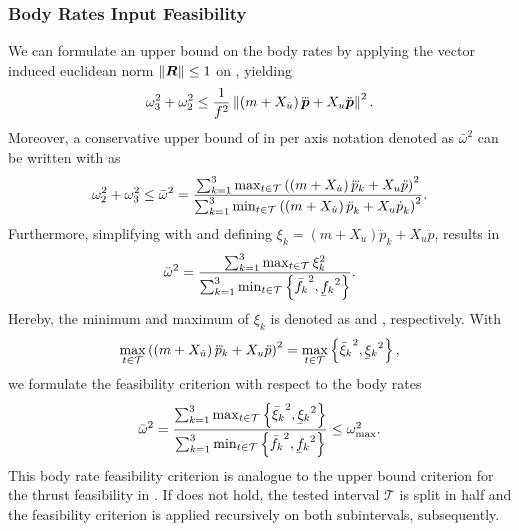 \subsubsection{Body Rates Input Feasibility}
We can formulate an upper bound on the body rates by applying the vector induced euclidean norm $\left\lVert\mbox{$\bm{R}$}\right\rVert \leq 1$ on , yielding
\begin{equation}
	\label{eq:body-rates-bound}
	\omega_3^2 + \omega_2^2 \leq
	\frac{1}{f^2}
	\left\lVert
		\left(
			m + X_{\dot{u}}
		\right) \mbox{$\dddot{\bm{p}}$} + X_u \mbox{$\ddot{\bm{p}}$}
	\right\rVert^2
	.
\end{equation}
Moreover, a conservative upper bound of  in per axis notation denoted as $\bar{\omega}^2$ can be written with  as
\begin{equation}
	\omega_2^2 + \omega_3^2
	\leq
	\bar{\omega}^2
	=
	\frac{
		\sum_{k=1}^{3}
		\max_{t \in \mathcal{T}}
		\left(
			\left(
				m + X_{\dot{u}}
			\right)\dddot{p}_k + X_u \ddot{p}
		\right)^2
	}{
		\sum_{k=1}^{3}
		\min_{t \in \mathcal{T}}
		\left(
			\left(m + X_{\dot{u}}\right)\mbox{$\ddot{p}$}_k
			+ X_u \mbox{$\dot{p}$}_k
		\right)^2
	}
	.
\end{equation}
Furthermore, simplifying with  and defining $\xi_k = \left(m + X_{\dot{u}}\right)\dddot{p}_k + X_u \ddot{p}$, results in
\begin{equation}
	\bar{\omega}^2 =
	\frac{
		\sum_{k=1}^{3}
		\max_{t \in \mathcal{T}}
		\xi_k^2
	}{
		\sum_{k=1}^{3}
		\min_{t \in \mathcal{T}}
		\left\{\fmaxaxis^2, \fminaxis^2\right\}
	}
	.
\end{equation}
Hereby, the minimum and maximum of $\xi_k$ is denoted as \ximaxaxis and \ximinaxis, respectively. With
\begin{equation}
	\max_{t \in \mathcal{T}}
	\left(
		\left(
			m + X_{\dot{u}}
		\right)
		\dddot{p}_k + X_u \ddot{p}
	\right)^2 =
	\max_{t \in \mathcal{T}}
	\left\{
		\ximaxaxis^2, \ximinaxis^2
	\right\}
	,
\end{equation}
we formulate the feasibility criterion with respect to the body rates
\begin{equation}
	\label{eq:body-rates-criterion-per-axis}
	\bar{\omega}^2
	=
	\frac{
		\sum_{k=1}^{3}
		\max_{t \in \mathcal{T}}
		\left\{
			\ximaxaxis^2, \ximinaxis^2
		\right\}
	}{
		\sum_{k=1}^{3}
		\min_{t \in \mathcal{T}}
		\left\{\fmaxaxis^2, \fminaxis^2\right\}
	}
	\leq
	\omegamaxsquare
	.
\end{equation}
This body rate feasibility criterion is analogue to the upper bound criterion for the thrust feasibility in . If  does not hold, the tested interval $\mathcal{T}$ is split in half and the feasibility criterion is applied recursively on both subintervals, subsequently.


